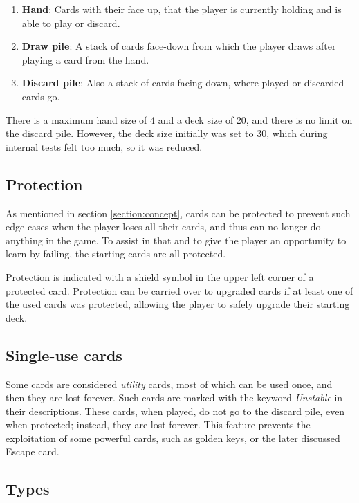 \begin{enumerate}
  \item \textbf{Hand}: Cards with their face up, that the player is currently holding and is able to play or discard. 
  \item \textbf{Draw pile}: A stack of cards face-down from which the player draws after playing a card from the hand.
  \item \textbf{Discard pile}: Also a stack of cards facing down, where played or discarded cards go.
\end{enumerate}

There is a maximum hand size of 4 and a deck size of 20, and there is no limit on the discard pile. However, the deck size initially was set to 30, which during internal tests felt too much, so it was reduced.



\subsection{Protection}

As mentioned in section \ref{section:concept}, cards can be protected to prevent such edge cases when the player loses all their cards, and thus can no longer do anything in the game. To assist in that and to give the player an opportunity to learn by failing, the starting cards are all protected.

Protection is indicated with a shield symbol in the upper left corner of a protected card. Protection can be carried over to upgraded cards if at least one of the used cards was protected, allowing the player to safely upgrade their starting deck.



\subsection{Single-use cards}

Some cards are considered \textit{utility} cards, most of which can be used once, and then they are lost forever. Such cards are marked with the keyword \textit{Unstable} in their descriptions. These cards, when played, do not go to the discard pile, even when protected; instead, they are lost forever. This feature prevents the exploitation of some powerful cards, such as golden keys, or the later discussed Escape card.



\subsection{Types}

